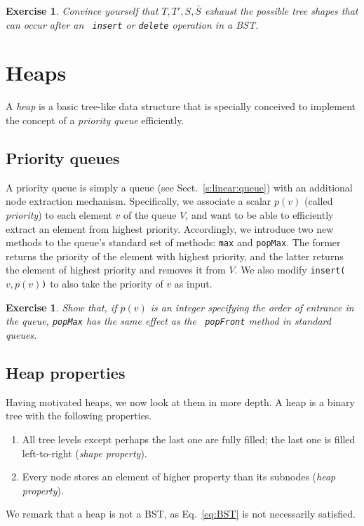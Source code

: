 \documentclass[a4paper]{book}
\theoremstyle{changebreak}                %
\newtheorem{ex}[result]{Exercise}
\begin{document}
\begin{ex}
Convince yourself that $T,T',S,\bar{S}$ exhaust the possible tree
shapes that can occur after an {\tt
  insert} or {\tt delete}
operation in a BST. 
\end{ex}

\section{Heaps}
\label{s:search:heap}
A {\it heap} is a basic tree-like data
structure that is specially conceived
to implement the concept of a {\it priority queue}
efficiently. 

\subsection{Priority queues}
\label{s:search:heap:priorityq}
A priority queue is simply a queue (see
Sect.~\ref{s:linear:queue}) with an additional node
extraction mechanism. Specifically, we
associate a scalar $p(v)$ (called {\it
  priority}) to each element $v$ of the queue $V$, and
want to be able to efficiently extract an element from highest
priority. Accordingly, we introduce two new
methods to the queue's standard set of methods: {\tt max}
and {\tt popMax}. The former returns the priority
of the element with highest priority, and the latter returns the
element of highest priority and removes it from $V$. We also modify
{\tt insert($v,p(v)$)} to also take the priority of $v$ as input.

\begin{ex}
Show that, if $p(v)$ is an integer specifying the order of entrance in
the queue, {\tt popMax} has the same effect as the {\tt
  popFront} method in standard queues.
\end{ex}

\subsection{Heap properties}
Having motivated heaps, we now look at them in more depth. A
heap is a binary tree with the
following properties.
\begin{enumerate}
\item All tree levels except perhaps the last one
  are fully filled; the last one is filled left-to-right ({\it shape
    property}).
\item Every node stores an element of higher property than its
  subnodes ({\it heap property}).
\end{enumerate}
We remark that a heap is not a BST, as
Eq.~\eqref{eq:BST} is not necessarily satisfied.
\end{document}
